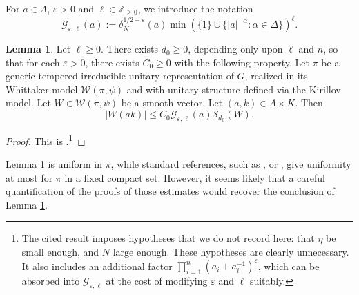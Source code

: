 \documentclass[reqno]{amsart}
\def\eps{\varepsilon}
\theoremstyle{plain} \newtheorem{theorem} {Theorem}
\theoremstyle{definition} \newtheorem{definition} [theorem] {Definition}
\theoremstyle{itplain} %
\newtheorem{lemma}[theorem]{Lemma}
\numberwithin{equation}{section}
\numberwithin{theorem}{section}
\renewcommand{\geq}{\geqslant}
\renewcommand{\leq}{\leqslant}
\begin{document}
For $a \in A$, $\eps > 0$ and $\ell \in \mathbb{Z}_{\geq 0}$, we introduce the notation
\begin{equation*}
  \mathcal{G}_{\eps,\ell}(a) := \delta_N^{1/2-\eps}(a)
  \min (\{1\} \cup \{|a|^{-\alpha} : \alpha \in \Delta \})^{\ell}.
\end{equation*}

\begin{lemma}\label{lem:sub-gln:let-ell-geq}
  Let $\ell \geq 0$.  There exists $d_0 \geq 0$, depending only upon $\ell$ and $n$, so that for each $\eps > 0$, there exists $C_0 \geq 0$ with the following property.  Let $\pi$ be a generic tempered irreducible unitary representation of $G$, realized in its Whittaker model $\mathcal{W}(\pi,\psi)$ and with unitary structure defined via the Kirillov model.  Let $W \in \mathcal{W}(\pi,\psi)$ be a smooth vector.  Let $(a,k) \in A \times K$.  Then
  \begin{equation*}
    |W(a k)| \leq C_0 \mathcal{G}_{\eps,\ell}(a) \mathcal{S}_{d_0}(W).
  \end{equation*}
\end{lemma}
\begin{proof}
  This is \cite[Lemma 5.2]{JN19a}.\footnote{The cited result imposes hypotheses that we do not record here: that $\eta$ be small enough, and $N$ large enough.  These hypotheses are clearly unnecessary.  It also includes an additional factor $\prod_{i=1}^{n} (a_i + a_i^{-1})^\eps$, which can be absorbed into $\mathcal{G}_{\eps,\ell}$ at the cost of modifying $\eps$ and $\ell$ suitably.}
\end{proof}
\begin{remark}
  Lemma \ref{lem:sub-gln:let-ell-geq} is uniform in $\pi$, while standard references, such as \cite[Prop 3.5]{MR2533003}, \cite[\S15]{MR1170566} or \cite[Prop 9]{MR2058615}, give uniformity at most for $\pi$ in a fixed compact set.  However, it seems likely that a careful quantification of the proofs of those estimates would recover the conclusion of Lemma \ref{lem:sub-gln:let-ell-geq}.
\end{remark}
\end{document}
